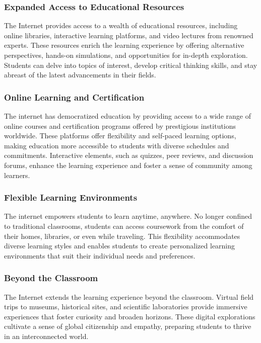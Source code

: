 \documentclass[a4paper,11pt]{article}
\begin{document}
\subsubsection{Expanded Access to Educational Resources}

The Internet provides access to a wealth of educational resources, including online libraries, interactive learning platforms, and video lectures from renowned experts. These resources enrich the learning experience by offering alternative perspectives, hands-on simulations, and opportunities for in-depth exploration. Students can delve into topics of interest, develop critical thinking skills, and stay abreast of the latest advancements in their fields.

\subsubsection {Online Learning and Certification}

The internet has democratized education by providing access to a wide range of online courses and certification programs offered by prestigious institutions worldwide. These platforms offer flexibility and self-paced learning options, making education more accessible to students with diverse schedules and commitments. Interactive elements, such as quizzes, peer reviews, and discussion forums, enhance the learning experience and foster a sense of community among learners.\cite{importance-reliable-internet-student}

\subsubsection{Flexible Learning Environments}

The internet empowers students to learn anytime, anywhere. No longer confined to traditional classrooms, students can access coursework from the comfort of their homes, libraries, or even while traveling. This flexibility accommodates diverse learning styles and enables students to create personalized learning environments that suit their individual needs and preferences.\cite{importance-reliable-internet-student}

\subsubsection{Beyond the Classroom}

The Internet extends the learning experience beyond the classroom. Virtual field trips to museums, historical sites, and scientific laboratories provide immersive experiences that foster curiosity and broaden horizons. These digital explorations cultivate a sense of global citizenship and empathy, preparing students to thrive in an interconnected world.
\end{document}
